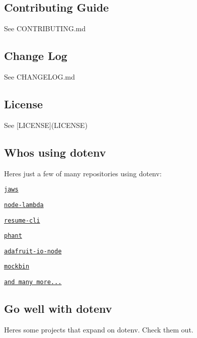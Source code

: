 \subsection*{Contributing Guide}

See C\+O\+N\+T\+R\+I\+B\+U\+T\+I\+NG.md

\subsection*{Change Log}

See C\+H\+A\+N\+G\+E\+L\+OG.md

\subsection*{License}

See \mbox{[}L\+I\+C\+E\+N\+SE\mbox{]}(L\+I\+C\+E\+N\+SE)

\subsection*{Who\textquotesingle{}s using dotenv}

Here\textquotesingle{}s just a few of many repositories using dotenv\+:


\begin{DoxyItemize}
\item \href{https://github.com/jaws-framework/jaws-core-js}{\tt jaws}
\item \href{https://github.com/motdotla/node-lambda}{\tt node-\/lambda}
\item \href{https://www.npmjs.com/package/resume-cli}{\tt resume-\/cli}
\item \href{https://www.npmjs.com/package/phant}{\tt phant}
\item \href{https://github.com/adafruit/adafruit-io-node}{\tt adafruit-\/io-\/node}
\item \href{https://www.npmjs.com/package/mockbin}{\tt mockbin}
\item \href{https://www.npmjs.com/browse/depended/dotenv}{\tt and many more...}
\end{DoxyItemize}

\subsection*{Go well with dotenv}

Here\textquotesingle{}s some projects that expand on dotenv. Check them out.


